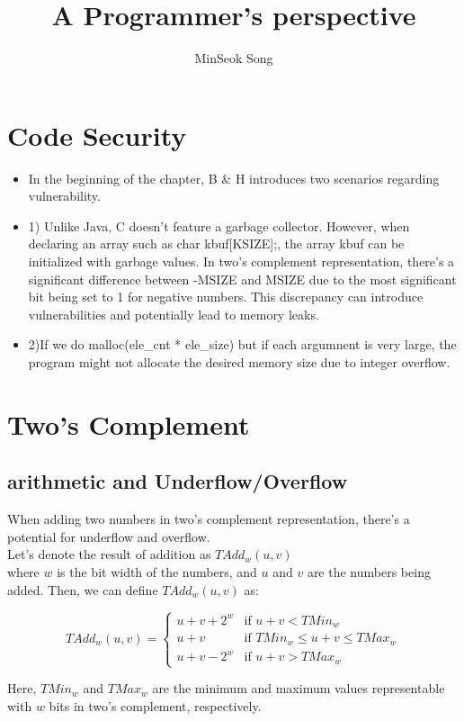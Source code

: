 \documentclass[11pt,reqno]{amsart}
\title{A Programmer's perspective}
\author{MinSeok Song}
\date{}
\theoremstyle{remark}
\begin{document}
\maketitle

\section*{Code Security}
\begin{itemize}
    \item In the beginning of the chapter, B $\&$ H introduces two scenarios regarding vulnerability.
    \item 1) Unlike Java, C doesn't feature a garbage collector. However, when declaring an array such as char kbuf[KSIZE];, the array kbuf can be initialized with garbage values. 
    In two's complement representation, there's a significant difference between -MSIZE and MSIZE due 
    to the most significant bit being set to 1 for negative numbers. This discrepancy can introduce vulnerabilities and potentially lead to memory leaks.
    \item 2)If we do malloc(ele\_cnt * ele\_size) but if each argumnent is very large, the program might not allocate the desired memory size due to integer overflow.
\end{itemize}

\section*{Two's Complement}
\subsection*{arithmetic and Underflow/Overflow}
When adding two numbers in two's complement representation, there's a potential for underflow and overflow. \\
Let's denote the result of addition as \(TAdd_w(u,v)\) \\ where \(w\) is the bit width of the numbers, and \(u\) and \(v\) 
are the numbers being added. Then, we can define \(TAdd_w(u,v)\) as:

\[
TAdd_w(u,v) = 
\begin{cases} 
    u + v + 2^w & \text{if } u + v < TMin_w \\
    u + v & \text{if } TMin_w \leq u + v \leq TMax_w \\
    u + v - 2^w & \text{if } u + v > TMax_w
\end{cases}
\]

Here, \(TMin_w\) and \(TMax_w\) are the minimum and maximum values representable with \(w\) bits in two's complement, respectively.
\end{document}
